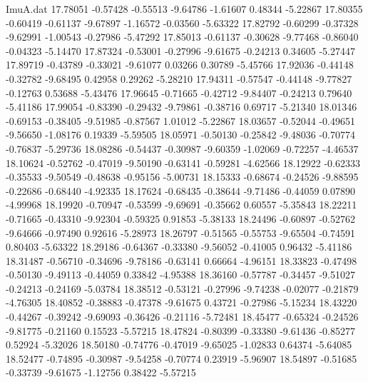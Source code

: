 \begin{filecontents}{ImuA.dat}
  17.78051   -0.57428   -0.55513   -9.64786   -1.61607    0.48344   -5.22867
  17.80355   -0.60419   -0.61137   -9.67897   -1.16572   -0.03560   -5.63322
  17.82792   -0.60299   -0.37328   -9.62991   -1.00543   -0.27986   -5.47292
  17.85013   -0.61137   -0.30628   -9.77468   -0.86040   -0.04323   -5.14470
  17.87324   -0.53001   -0.27996   -9.61675   -0.24213    0.34605   -5.27447
  17.89719   -0.43789   -0.33021   -9.61077    0.03266    0.30789   -5.45766
  17.92036   -0.44148   -0.32782   -9.68495    0.42958    0.29262   -5.28210
  17.94311   -0.57547   -0.44148   -9.77827   -0.12763    0.53688   -5.43476
  17.96645   -0.71665   -0.42712   -9.84407   -0.24213    0.79640   -5.41186
  17.99054   -0.83390   -0.29432   -9.79861   -0.38716    0.69717   -5.21340
  18.01346   -0.69153   -0.38405   -9.51985   -0.87567    1.01012   -5.22867
  18.03657   -0.52044   -0.49651   -9.56650   -1.08176    0.19339   -5.59505
  18.05971   -0.50130   -0.25842   -9.48036   -0.70774   -0.76837   -5.29736
  18.08286   -0.54437   -0.30987   -9.60359   -1.02069   -0.72257   -4.46537
  18.10624   -0.52762   -0.47019   -9.50190   -0.63141   -0.59281   -4.62566
  18.12922   -0.62333   -0.35533   -9.50549   -0.48638   -0.95156   -5.00731
  18.15333   -0.68674   -0.24526   -9.88595   -0.22686   -0.68440   -4.92335
  18.17624   -0.68435   -0.38644   -9.71486   -0.44059    0.07890   -4.99968
  18.19920   -0.70947   -0.53599   -9.69691   -0.35662    0.60557   -5.35843
  18.22211   -0.71665   -0.43310   -9.92304   -0.59325    0.91853   -5.38133
  18.24496   -0.60897   -0.52762   -9.64666   -0.97490    0.92616   -5.28973
  18.26797   -0.51565   -0.55753   -9.65504   -0.74591    0.80403   -5.63322
  18.29186   -0.64367   -0.33380   -9.56052   -0.41005    0.96432   -5.41186
  18.31487   -0.56710   -0.34696   -9.78186   -0.63141    0.66664   -4.96151
  18.33823   -0.47498   -0.50130   -9.49113   -0.44059    0.33842   -4.95388
  18.36160   -0.57787   -0.34457   -9.51027   -0.24213   -0.24169   -5.03784
  18.38512   -0.53121   -0.27996   -9.74238   -0.02077   -0.21879   -4.76305
  18.40852   -0.38883   -0.47378   -9.61675    0.43721   -0.27986   -5.15234
  18.43220   -0.44267   -0.39242   -9.69093   -0.36426   -0.21116   -5.72481
  18.45477   -0.65324   -0.24526   -9.81775   -0.21160    0.15523   -5.57215
  18.47824   -0.80399   -0.33380   -9.61436   -0.85277    0.52924   -5.32026
  18.50180   -0.74776   -0.47019   -9.65025   -1.02833    0.64374   -5.64085
  18.52477   -0.74895   -0.30987   -9.54258   -0.70774    0.23919   -5.96907
  18.54897   -0.51685   -0.33739   -9.61675   -1.12756    0.38422   -5.57215

\end{filecontents}
